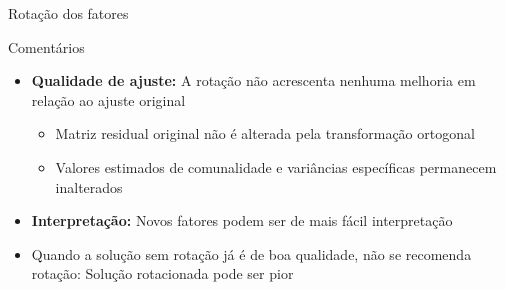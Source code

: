 \documentclass[
  ignorenonframetext,
  aspectratio=169,
]{beamer}
\providecommand{\tightlist}{%
  \setlength{\itemsep}{0pt}\setlength{\parskip}{0pt}}
\begin{document}
\begin{frame}{Rotação dos fatores}
\label{rotauxe7uxe3o-dos-fatores-7}
\begin{block}{Comentários}
\label{comentuxe1rios-1}
\begin{itemize}
\tightlist
\item
  \textbf{Qualidade de ajuste:} A rotação não acrescenta nenhuma
  melhoria em relação ao ajuste original

  \begin{itemize}
  \tightlist
  \item
    Matriz residual original não é alterada pela transformação ortogonal
  \item
    Valores estimados de comunalidade e variâncias específicas
    permanecem inalterados
  \end{itemize}
\end{itemize}

\medskip

\begin{itemize}
\tightlist
\item
  \textbf{Interpretação:} Novos fatores podem ser de mais fácil
  interpretação
\end{itemize}

\medskip

\begin{itemize}
\tightlist
\item
  Quando a solução sem rotação já é de boa qualidade, não se recomenda
  rotação: Solução rotacionada pode ser pior
\end{itemize}
\end{block}
\end{frame}
\end{document}
